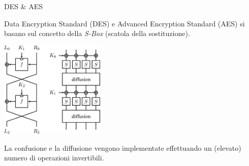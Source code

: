 \documentclass[handout, xcolor=dvipsnames,aspectratio=169]{beamer}
\begin{document}
\begin{frame}{DES \& AES}
  
  Data Encryption Standard (DES) e Advanced Encryption Standard (AES) si basano sul concetto della \textit{S-Box} (scatola della sostituzione).

  \pause
  
  \medskip
  
  \centering\includegraphics[width=5cm]{img/des} 
  
  \medskip

  La confusione e la diffusione vengono implementate effettuando un (elevato) numero di operazioni invertibili.
  
\end{frame}
\end{document}
